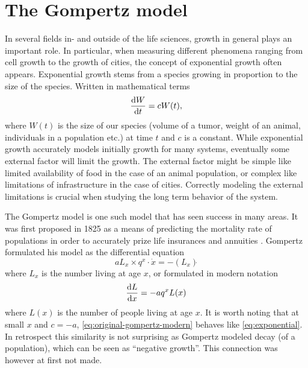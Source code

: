 \chapter{The Gompertz model}

In several fields in- and outside of the life sciences, growth in general plays an important role.
In particular, when measuring different phenomena ranging from cell growth to the growth of cities, the concept of exponential growth often appears.
Exponential growth stems from a species growing in proportion to the size of the species.
Written in mathematical terms
\begin{equation} \label{eq:exponential}
  \dv{W}{t} = c W(t),
\end{equation}
where \(W(t)\) is the size of our species (volume of a tumor, weight of an animal, individuals in a population etc.) at time \(t\) and \(c\) is a constant.
While exponential growth accurately models initially growth for many systems, eventually some external factor will limit the growth.
The external factor might be simple like limited availability of food in the case of an animal population, or complex like limitations of infrastructure in the case of cities. %
Correctly modeling the external limitations is crucial when studying the long term behavior of the system.

The Gompertz model is one such model that has seen success in many areas.
It was first proposed in 1825 as a means of predicting the mortality rate of populations in order to accurately prize life insurances and annuities \cite{gompertz1825nature}.
Gompertz formulated his model as the differential equation
\begin{equation} \label{eq:original-gompertz}
  a L_x \times q^x \cdot \dot{x} = - (L_x)\dot{}
\end{equation}
where \(L_x\) is the number living at age \(x\), or formulated in modern notation
\begin{equation} \label{eq:original-gompertz-modern}
  \dv{L}{x} = -a q^x L(x)
\end{equation}
where \(L(x)\) is the number of people living at age \(x\).
It is worth noting that at small \(x\) and \(c = -a\), \cref{eq:original-gompertz-modern} behaves like \cref{eq:exponential}.
In retrospect this similarity is not surprising as Gompertz modeled decay (of a population), which can be seen as \enquote{negative growth}.
This connection was however at first not made.

